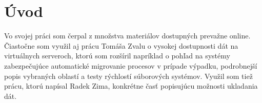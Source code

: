 \chapter*{Úvod}

Vo svojej práci som čerpal z množstva materiálov dostupných prevažne online. Čiastočne som využil aj prácu Tomáša Zvalu\cite{tomaszvala} o vysokej dostupnosti dát na virtuálnych serveroch, ktorú som rozšíril napríklad o pohľad na systémy zabezpečujúce automatické migrovanie procesov v prípade výpadku, podrobnejší popis vybraných oblastí a testy rýchlostí súborových systémov. Využil som tiež prácu, ktorú napísal Radek Zima\cite{radekzima}, konkrétne časť popisujúcu možnosti ukladania dát.


\emptydoublepage